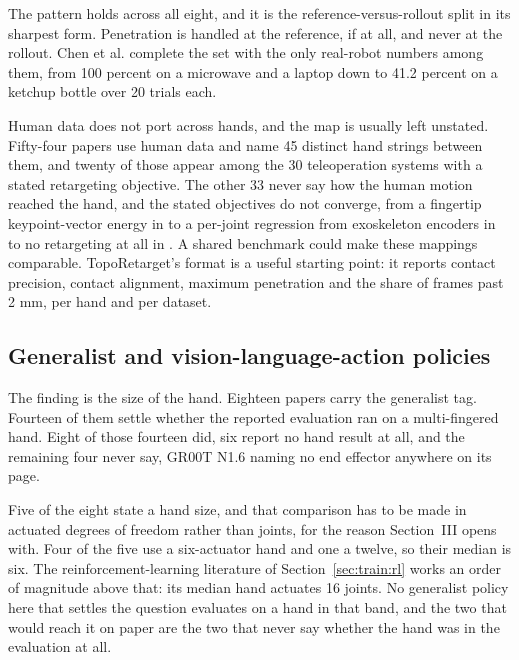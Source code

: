 The pattern holds across all eight, and it is the reference-versus-rollout split in its sharpest
form. Penetration is handled at the reference, if at all, and never at the rollout. Chen et al.
\cite{objdex_2024} complete the set with the only real-robot numbers among them, from 100 percent
on a microwave and a laptop down to 41.2 percent on a ketchup bottle over 20 trials each.

Human data does not port across hands, and the map is usually
left unstated. Fifty-four papers use human data and name 45 distinct hand strings between
them, and twenty of those appear among the 30 teleoperation systems with a stated retargeting
objective. The other 33 never say how the human motion reached the hand, and the stated
objectives do not converge, from a fingertip keypoint-vector energy in \cite{anyteleop_2023} to
a per-joint regression from exoskeleton encoders in \cite{dexumi_2025} to no retargeting at all
in \cite{egozero_2025}. A shared benchmark could make these mappings comparable. TopoRetarget's
format \cite{toporetarget_2026} is a useful starting point: it reports contact precision,
contact alignment, maximum penetration and the share of frames past 2 mm, per hand and per
dataset.

\subsection{Generalist and vision-language-action policies}
\label{sec:train:vla}

The finding is the size of the hand. Eighteen papers carry the generalist tag. Fourteen of them
settle whether the reported evaluation ran on a multi-fingered hand. Eight of those fourteen did,
six report no hand result at all, and the remaining four never say, GR00T N1.6
\cite{groot_n16_2025} naming no end effector anywhere on its page.

Five of the eight state a hand size, and that comparison has to be made in actuated degrees of
freedom rather than joints, for the reason Section~III opens with. Four of the five use a
six-actuator hand and one a twelve, so their median is six. The reinforcement-learning literature
of Section~\ref{sec:train:rl} works an order of magnitude above that: its median hand actuates 16
joints. No generalist policy here that settles the question evaluates on a hand in that band, and
the two that would reach it on paper are the two that never say whether the hand was in the
evaluation at all.


